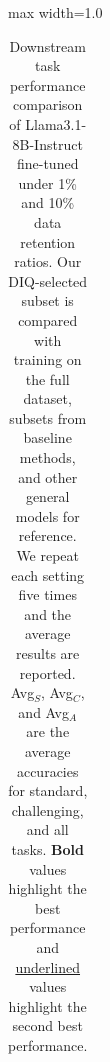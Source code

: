 \documentclass[letterpaper]{article} %
\begin{document}
\begin{table}[!t]
\begin{adjustbox}{max width=1.0\textwidth}
\begin{tabular}{llcccccccccccc}
\end{tabular}
\end{adjustbox}
\caption{Downstream task performance comparison of Llama3.1-8B-Instruct fine-tuned under 1\% and 10\% data retention ratios. Our DIQ-selected subset is compared with training on the full dataset, subsets from baseline methods, and other general models for reference. We repeat each setting five times and the average results are reported. Avg$_S$, Avg$_C$, and Avg$_A$ are the average accuracies for standard, challenging, and all tasks. \textbf{Bold} values highlight the best performance and \underline{underlined} values highlight the second best performance.
}
\label{tab:main_llama31}
\end{table}
\end{document}

